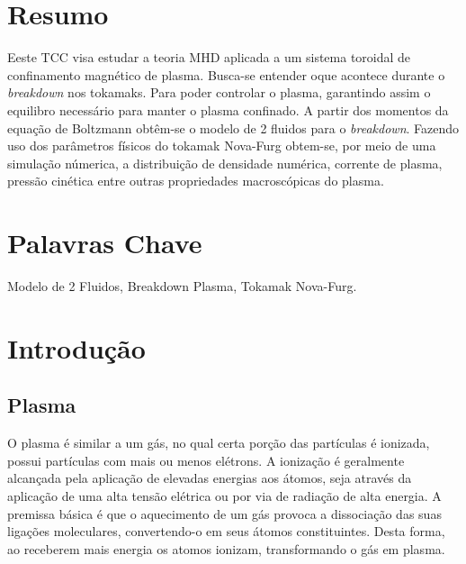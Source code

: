 \documentclass[12pt,oneside,a4paper]{abntex2}
\begin{document}
\imprimircapa

\imprimirfolhaderosto*



\listoftables*
\listoffigures*

\tableofcontents*

\newpage
\mainmatter
\begingroup
\let\clearpage\relax
\setlength\afterchapskip{\lineskip}
\chapter{Resumo}
Eeste TCC visa estudar a teoria MHD aplicada a um sistema toroidal de confinamento magnético de plasma. Busca-se entender oque acontece durante o \textit{breakdown} nos tokamaks. Para poder controlar o plasma, garantindo assim o equilibro necessário para manter o plasma confinado. A partir dos momentos da equação de Boltzmann obtêm-se o modelo de 2 fluidos para o \textit{breakdown}. Fazendo uso dos parâmetros físicos do tokamak Nova-Furg obtem-se, por meio de uma simulação númerica, a distribuição de densidade numérica, corrente de plasma, pressão cinética entre outras propriedades macroscópicas do plasma.

\chapter{Palavras Chave}
Modelo de 2 Fluidos, Breakdown Plasma, Tokamak Nova-Furg.

\chapter{Introdução} 

\section{Plasma}

O plasma é similar a um gás, no qual certa porção das partículas é ionizada, possui partículas com mais ou menos elétrons. A ionização é geralmente alcançada pela aplicação de elevadas energias aos átomos, seja através da aplicação de uma alta tensão elétrica ou por via de radiação de alta energia.
A premissa básica é que o aquecimento de um gás provoca a dissociação das suas ligações moleculares, convertendo-o em seus átomos constituintes. Desta forma, ao receberem mais energia os atomos ionizam, transformando o gás em plasma. \cite{tokamaks}
\end{document}
